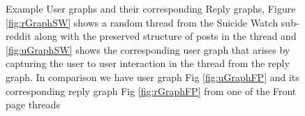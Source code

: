\begin{figure}[!ht]
    \centering
    
    
    \caption{ Example User graphs and their corresponding Reply graphs, Figure \ref{fig:rGraphSW} shows a random thread from the Suicide Watch sub-reddit along with the preserved structure of posts in the thread and \ref{fig:uGraphSW} shows the corresponding user graph that arises by capturing the user to user interaction in the thread from the reply graph. In comparison we have user graph Fig \ref{fig:uGraphFP} and its corresponding reply graph Fig \ref{fig:rGraphFP} from one of the Front page threads }
    \label{Fig:GraphExamples}
\end{figure}


